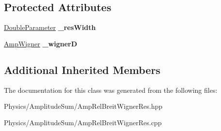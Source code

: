 \subsection*{Protected Attributes}
\begin{DoxyCompactItemize}
\item 
\hypertarget{class_amp_rel_breit_wigner_res_a05d7b775ee20505e42b699870ca99441}{\hyperlink{class_double_parameter}{Double\-Parameter} {\bfseries \-\_\-res\-Width}}\label{class_amp_rel_breit_wigner_res_a05d7b775ee20505e42b699870ca99441}

\item 
\hypertarget{class_amp_rel_breit_wigner_res_a421833c73971ecd0c5a9d478a0798c13}{\hyperlink{class_amp_wigner}{Amp\-Wigner} {\bfseries \-\_\-wigner\-D}}\label{class_amp_rel_breit_wigner_res_a421833c73971ecd0c5a9d478a0798c13}

\end{DoxyCompactItemize}
\subsection*{Additional Inherited Members}


The documentation for this class was generated from the following files\-:\begin{DoxyCompactItemize}
\item 
Physics/\-Amplitude\-Sum/Amp\-Rel\-Breit\-Wigner\-Res.\-hpp\item 
Physics/\-Amplitude\-Sum/Amp\-Rel\-Breit\-Wigner\-Res.\-cpp\end{DoxyCompactItemize}
